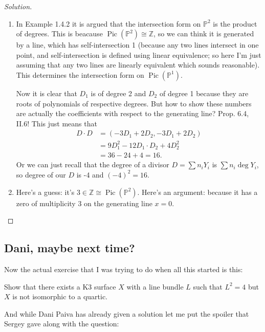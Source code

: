 \begin{proof}[Solution]\leavevmode
\begin{enumerate}[label=(\alph*)]
\item In Example 1.4.2 it is argued that the intersection form on $\mathbb{P}^2$ is the product of degrees. This is beacause $\operatorname{Pic}(\mathbb{P}^2) \cong\mathbb{Z}$, so we can think it is generated by a line, which has self-intersection 1 (because any two lines intersect in one point, and self-intersection is defined using linear equivalence; so here I'm just assuming that any two lines are linearly equivalent which sounds reasonable). This determines the intersection form on $\operatorname{Pic}(\mathbb{P}^1)$.

	Now it is clear that $D_1$ is of degree 2 and $D_2$ of degree 1 because they are roots of polynomials of respective degrees. {\color{2}But how to show these numbers are actually the coefficients with respect to the generating line? Prop. 6.4, II.6!} This just means that
\begin{align*}
	D\cdot D&=(-3D_1+2D_2,-3D_1+2D_2)\\
	&=9D_1^2-12D_1\cdot D_2+4D_2^2\\
	&=36-24+4=16.
\end{align*}
Or we can just recall that the degree of a divisor $D=\sum n_iY_i$ is $\sum n_{i}\operatorname{deg}Y_i$, so degree of our  $D$ is -4 and $(-4)^2=16$.
\item Here's a guess: it's $3 \in\mathbb{Z}\cong \operatorname{Pic}(\mathbb{P}^2)$. Here's an argument: because it has a zero of multiplicity 3 on the generating line $x=0$.
\end{enumerate}
\end{proof}

\subsection{Dani, maybe next time?}

Now the actual exercise that I was trying to do when all this started is this:

\begin{exercise}\leavevmode
	Show that there exists a K3 surface $X$ with a line bundle  $L$ such that  $L^2=4$ but $X$ is not isomorphic to a quartic.
\end{exercise}

And while Dani Paiva has already given a solution let me put the spoiler that Sergey gave along with the question: 

